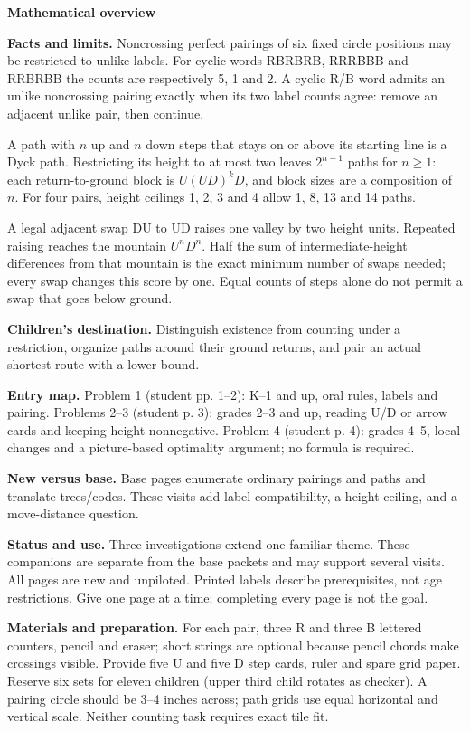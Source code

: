 \documentclass[11pt]{article}
\begin{document}
{\Large\bfseries Mathematical overview}\par\medskip
\textbf{Facts and limits.} Noncrossing perfect pairings of six fixed circle positions may be restricted to unlike labels. For cyclic words RBRBRB, RRRBBB and RRBRBB the counts are respectively 5, 1 and 2. A cyclic R/B word admits an unlike noncrossing pairing exactly when its two label counts agree: remove an adjacent unlike pair, then continue.

A path with \(n\) up and \(n\) down steps that stays on or above its starting line is a Dyck path. Restricting its height to at most two leaves \(2^{n-1}\) paths for \(n\geq1\): each return-to-ground block is \(U(UD)^kD\), and block sizes are a composition of \(n\). For four pairs, height ceilings 1, 2, 3 and 4 allow 1, 8, 13 and 14 paths.

A legal adjacent swap DU to UD raises one valley by two height units. Repeated raising reaches the mountain \(U^nD^n\). Half the sum of intermediate-height differences from that mountain is the exact minimum number of swaps needed; every swap changes this score by one. Equal counts of steps alone do not permit a swap that goes below ground.

\textbf{Children's destination.} Distinguish existence from counting under a restriction, organize paths around their ground returns, and pair an actual shortest route with a lower bound.

\textbf{Entry map.} Problem 1 (student pp. 1--2): K--1 and up, oral rules, labels and pairing. Problems 2--3 (student p. 3): grades 2--3 and up, reading U/D or arrow cards and keeping height nonnegative. Problem 4 (student p. 4): grades 4--5, local changes and a picture-based optimality argument; no formula is required.

\textbf{New versus base.} Base pages enumerate ordinary pairings and paths and translate trees/codes. These visits add label compatibility, a height ceiling, and a move-distance question.
\par\medskip
\textbf{Status and use.} Three investigations extend one familiar theme. These companions are separate from the base packets and may support several visits. All pages are new and unpiloted. Printed labels describe prerequisites, not age restrictions. Give one page at a time; completing every page is not the goal.

\textbf{Materials and preparation.} For each pair, three R and three B lettered counters, pencil and eraser; short strings are optional because pencil chords make crossings visible. Provide five U and five D step cards, ruler and spare grid paper. Reserve six sets for eleven children (upper third child rotates as checker). A pairing circle should be 3–4 inches across; path grids use equal horizontal and vertical scale. Neither counting task requires exact tile fit.
\end{document}
